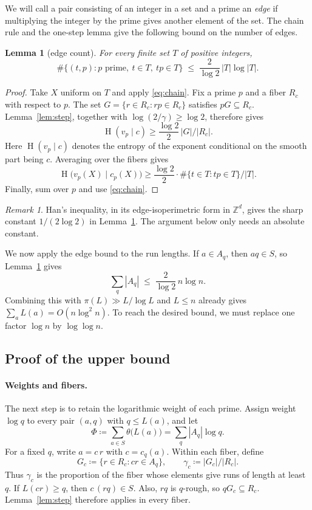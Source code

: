 \documentclass[11pt]{article}
\newtheorem{lemma}[theorem]{Lemma}
\theoremstyle{remark}
\newtheorem{remark}[theorem]{Remark}
\DeclareMathOperator{\HH}{H}
\begin{document}
We will call a pair consisting of an integer in a set and a prime an \emph{edge} if multiplying the integer by the prime gives another element of the set.
The chain rule and the one-step lemma give the following bound on the number of edges.

\begin{lemma}[edge count]\label{lem:edges}
For every finite set $T$ of positive integers,
\[
  \#\{(t,p): p \text{ prime},\ t\in T,\ tp\in T\}\;\le\;\frac{2}{\log 2}\,|T|\log|T| .
\]
\end{lemma}

\begin{proof}
Take $X$ uniform on $T$ and apply \eqref{eq:chain}.
Fix a prime $p$ and a fiber $R_c$ with respect to $p$.
The set $G=\{r\in R_c: rp\in R_c\}$ satisfies $pG\subseteq R_c$.
Lemma~\ref{lem:step}, together with $\log(2/\gamma)\ge\log 2$, therefore gives
\[
  \HH(v_p\mid c)\ge\frac{\log 2}{2}\,|G|/|R_c|.
\]
Here $\HH(v_p\mid c)$ denotes the entropy of the exponent conditional on the smooth part being $c$.
Averaging over the fibers gives
\[
  \HH\bigl(v_p(X)\mid c_p(X)\bigr)\ge\frac{\log2}{2}\cdot\#\{t\in T:tp\in T\}/|T|.
\]
Finally, sum over $p$ and use \eqref{eq:chain}.
\end{proof}

\begin{remark}
Han's inequality, in its edge-isoperimetric form in $\mathbb{Z}^d$, gives the sharp constant $1/(2\log 2)$ in Lemma~\ref{lem:edges}.
The argument below only needs an absolute constant.
\end{remark}

We now apply the edge bound to the run lengths.
If $a\in A_q$, then $aq\in S$, so Lemma~\ref{lem:edges} gives
\begin{equation}\label{eq:edges}
  \sum_q|A_q|\;\le\;\frac{2}{\log 2}\,n\log n .
\end{equation}
Combining this with $\pi(L)\gg L/\log L$ and $L\le n$ already gives $\sum_a L(a)=O(n\log^2 n)$.
To reach the desired bound, we must replace one factor $\log n$ by $\log\log n$.

\subsection{Proof of the upper bound}

\paragraph{Weights and fibers.}
The next step is to retain the logarithmic weight of each prime.
Assign weight $\log q$ to every pair $(a,q)$ with $q\le L(a)$, and let
\[
  \Phi\coloneqq\sum_{a\in S}\theta\bigl(L(a)\bigr)=\sum_q|A_q|\log q .
\]
For a fixed $q$, write $a=c\,r$ with $c=c_q(a)$.
Within each fiber, define
\[
  G_c\coloneqq\{r\in R_c : cr\in A_q\},\qquad \gamma_c\coloneqq|G_c|/|R_c| .
\]
Thus $\gamma_c$ is the proportion of the fiber whose elements give runs of length at least $q$.
If $L(cr)\ge q$, then $c\,(rq)\in S$.
Also, $rq$ is $q$-rough, so $qG_c\subseteq R_c$.
Lemma~\ref{lem:step} therefore applies in every fiber.
\end{document}
